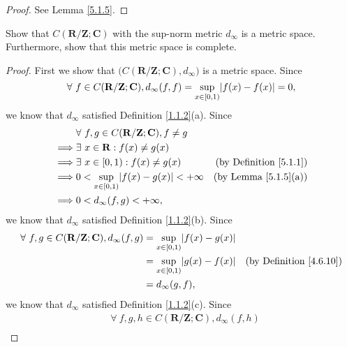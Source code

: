 \begin{proof}
    See Lemma \ref{5.1.5}.
\end{proof}

\begin{exercise}\label{ex 5.1.3}
    Show that \(C(\mathbf{R} / \mathbf{Z} ; \mathbf{C})\) with the sup-norm metric \(d_\infty\) is a metric space.
    Furthermore, show that this metric space is complete.
\end{exercise}

\begin{proof}
    First we show that \(\big(C(\mathbf{R} / \mathbf{Z} ; \mathbf{C}), d_\infty\big)\) is a metric space.
    Since
    \[
        \forall\ f \in C(\mathbf{R} / \mathbf{Z} ; \mathbf{C}), d_\infty(f, f) = \sup_{x \in [0, 1)} \abs*{f(x) - f(x)} = 0,
    \]
    we know that \(d_\infty\) satisfied Definition \ref{1.1.2}(a).
    Since
    \begin{align*}
                 & \forall\ f, g \in C(\mathbf{R} / \mathbf{Z} ; \mathbf{C}), f \neq g                                      \\
        \implies & \exists\ x \in \mathbf{R} : f(x) \neq g(x)                                                               \\
        \implies & \exists\ x \in [0, 1) : f(x) \neq g(x)                              & \text{(by Definition \ref{5.1.1})} \\
        \implies & 0 < \sup_{x \in [0, 1)} \abs*{f(x) - g(x)} < +\infty                & \text{(by Lemma \ref{5.1.5}(a))}   \\
        \implies & 0 < d_\infty(f, g) < +\infty,
    \end{align*}
    we know that \(d_\infty\) satisfied Definition \ref{1.1.2}(b).
    Since
    \begin{align*}
        \forall\ f, g \in C(\mathbf{R} / \mathbf{Z} ; \mathbf{C}), d_\infty(f, g) & = \sup_{x \in [0, 1)} \abs*{f(x) - g(x)}                                       \\
                                                                                  & = \sup_{x \in [0, 1)} \abs*{g(x) - f(x)} & \text{(by Definition \ref{4.6.10})} \\
                                                                                  & = d_\infty(g, f),
    \end{align*}
    we know that \(d_\infty\) satisfied Definition \ref{1.1.2}(c).
    Since
    \begin{align*}
         & \forall\ f, g, h \in C(\mathbf{R} / \mathbf{Z} ; \mathbf{C}), d_\infty(f, h)                                  \\

\end{align*}
\end{proof}
